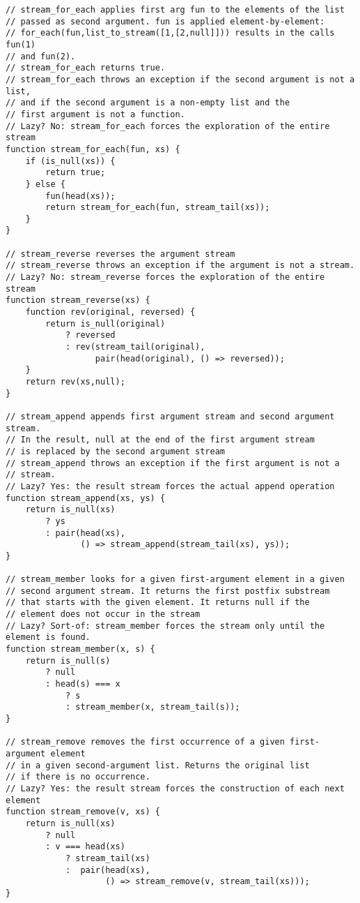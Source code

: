 \begin{lstlisting}
// stream_for_each applies first arg fun to the elements of the list
// passed as second argument. fun is applied element-by-element:
// for_each(fun,list_to_stream([1,[2,null]])) results in the calls fun(1)
// and fun(2).
// stream_for_each returns true.
// stream_for_each throws an exception if the second argument is not a list,
// and if the second argument is a non-empty list and the
// first argument is not a function.
// Lazy? No: stream_for_each forces the exploration of the entire stream
function stream_for_each(fun, xs) {
    if (is_null(xs)) {
        return true;
    } else {
        fun(head(xs));
        return stream_for_each(fun, stream_tail(xs));
    }
}

// stream_reverse reverses the argument stream
// stream_reverse throws an exception if the argument is not a stream.
// Lazy? No: stream_reverse forces the exploration of the entire stream
function stream_reverse(xs) {
    function rev(original, reversed) {
        return is_null(original)
            ? reversed
            : rev(stream_tail(original), 
                  pair(head(original), () => reversed));
    }
    return rev(xs,null);
}

// stream_append appends first argument stream and second argument stream.
// In the result, null at the end of the first argument stream
// is replaced by the second argument stream
// stream_append throws an exception if the first argument is not a
// stream.
// Lazy? Yes: the result stream forces the actual append operation
function stream_append(xs, ys) {
    return is_null(xs)
        ? ys
        : pair(head(xs),
               () => stream_append(stream_tail(xs), ys)); 
}

// stream_member looks for a given first-argument element in a given
// second argument stream. It returns the first postfix substream
// that starts with the given element. It returns null if the
// element does not occur in the stream
// Lazy? Sort-of: stream_member forces the stream only until the element is found.
function stream_member(x, s) {
    return is_null(s)
        ? null
        : head(s) === x
            ? s
            : stream_member(x, stream_tail(s));
}

// stream_remove removes the first occurrence of a given first-argument element
// in a given second-argument list. Returns the original list
// if there is no occurrence.
// Lazy? Yes: the result stream forces the construction of each next element
function stream_remove(v, xs) {
    return is_null(xs)
        ? null
        : v === head(xs)
            ? stream_tail(xs)
            :  pair(head(xs), 
                    () => stream_remove(v, stream_tail(xs))); 
}


\end{lstlisting}
